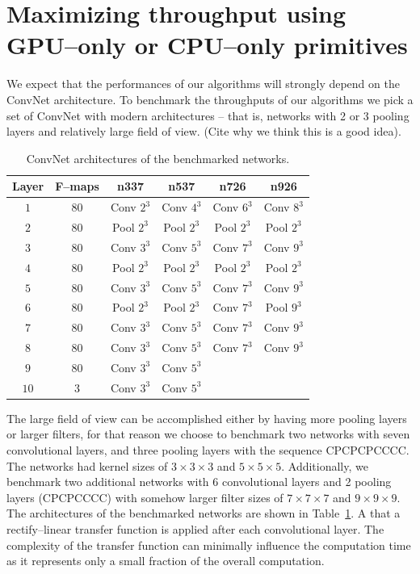\documentclass[conference]{IEEEtran}
\begin{document}
\section{Maximizing throughput using GPU--only or CPU--only primitives}

  We expect that the performances of our algorithms will strongly
  depend on the ConvNet architecture.  To benchmark the throughputs of
  our algorithms we pick a set of ConvNet with modern architectures --
  that is, networks with 2 or 3 pooling layers and relatively large
  field of view. (Cite why we think this is a good idea).

  \begin{table}
    \centering
    \begin{tabular}{cccccc}
      \toprule
      Layer & F--maps & n337    & n537  &  n726  &  n926 \\
      \midrule
      $1$ & 80 &  Conv $2^3$  & Conv $4^3$  & Conv $6^3$  & Conv $8^3$ \\
      $2$ & 80 &  Pool $2^3$  & Pool $2^3$  & Pool $2^3$  & Pool $2^3$ \\
      $3$ & 80 &  Conv $3^3$  & Conv $5^3$  & Conv $7^3$  & Conv $9^3$ \\
      $4$ & 80 &  Pool $2^3$  & Pool $2^3$  & Pool $2^3$  & Pool $2^3$ \\
      $5$ & 80 &  Conv $3^3$  & Conv $5^3$  & Conv $7^3$  & Conv $9^3$ \\
      $6$ & 80 &  Pool $2^3$  & Pool $2^3$  & Conv $7^3$  & Pool $9^3$ \\
      $7$ & 80 &  Conv $3^3$  & Conv $5^3$  & Conv $7^3$  & Conv $9^3$ \\
      $8$ & 80 &  Conv $3^3$  & Conv $5^3$  & Conv $7^3$  & Conv $9^3$ \\
      $9$ & 80 & Conv $3^3$  & Conv $5^3$  & & \\
      $10$ & 3 & Conv $3^3$  & Conv $5^3$  & & \\
      \bottomrule
    \end{tabular}
    \caption{ConvNet architectures of the benchmarked networks.}
    \label{table:benchmarked_networks}
  \end{table}

  The large field of view can be accomplished either by having more
  pooling layers or larger filters, for that reason we choose to
  benchmark two networks with seven convolutional layers, and three
  pooling layers with the sequence CPCPCPCCCC.  The networks had
  kernel sizes of $3\times 3 \times 3$ and $5\times 5\times 5$.
  Additionally, we benchmark two additional networks with 6
  convolutional layers and 2 pooling layers (CPCPCCCC) with somehow
  larger filter sizes of $7 \times 7 \times 7$ and $9 \times 9 \times
  9$.  The architectures of the benchmarked networks are shown in
  Table~\ref{table:benchmarked_networks}.  A that a rectify--linear
  transfer function is applied after each convolutional layer.  The
  complexity of the transfer function can minimally influence the
  computation time as it represents only a small fraction of the
  overall computation.
\end{document}
